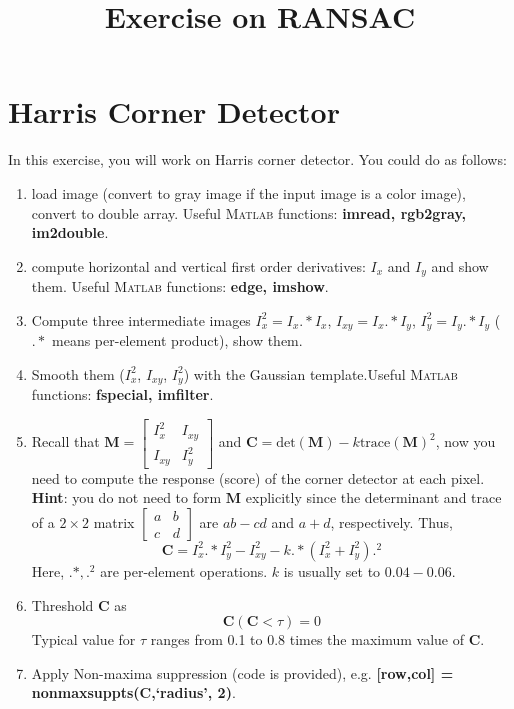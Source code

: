 \documentclass[a4paper]{article}
\begin{document}
\title{Exercise on RANSAC}
\maketitle%

\section{Harris Corner Detector}

In this exercise, you will work on Harris corner detector. You could do as follows:
\begin{enumerate}
\item load image (convert to gray image if the input image is a color image), convert to double array. Useful \textsc{Matlab} functions: \textbf{imread, rgb2gray, im2double}. 
\item compute horizontal and vertical first order derivatives: $I_x$ and $I_y$ and show them. Useful \textsc{Matlab} functions: \textbf{edge, imshow}. 
\item Compute three intermediate images $I_x^2=I_x.*I_x$, $I_{xy}=I_x.*I_y$, $I_y^2=I_y.*I_y$ ($.*$ means per-element product), show them.
\item Smooth them ($I_x^2$, $I_{xy}$, $I_y^2$) with the Gaussian template.Useful \textsc{Matlab} functions: \textbf{fspecial, imfilter}.  
\item Recall that $\mathbf{M}=\left[\begin{matrix}
I_x^2 & I_{xy} \\ I_{xy} & I_y^2
\end{matrix}\right]$ and $\mathbf{C}=\text{det}(\mathbf{M})-k\text{trace}(\mathbf{M})^2$, now you need to compute the response (score) of the corner detector at each pixel. \textbf{Hint}: you do not need to form $\mathbf{M}$ explicitly since the determinant and trace of a $2\times 2$ matrix 
$\left[\begin{matrix}
a & b \\ c & d 
\end{matrix}\right]$ are $ab-cd$ and $a+d$, respectively. Thus, $$\mathbf{C}=I_x^2.*I_y^2-I_{xy}^2-k.*(I_x^2+I_y^2).^2$$
Here, $.*, .^2$ are per-element operations. $k$ is usually set to $0.04-0.06$.
\item Threshold $\mathbf{C}$ as
$$
\mathbf{C}(\mathbf{C}<\tau)=0
$$
Typical value for $\tau$ ranges from 0.1 to 0.8 times the maximum value of $\mathbf{C}$.
\item Apply Non-maxima suppression (code is provided), e.g. \textbf{[row,col] = nonmaxsuppts(C,`radius', 2)}.
\end{enumerate}
\end{document}
